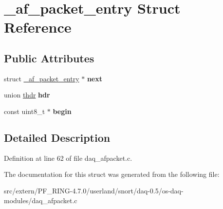 \hypertarget{struct__af__packet__entry}{
\section{\_\-af\_\-packet\_\-entry Struct Reference}
\label{struct__af__packet__entry}
}
\subsection*{Public Attributes}
\begin{DoxyCompactItemize}
\item 
\hypertarget{struct__af__packet__entry_a75d19df922f769b2d067deb10901497d}{
struct \hyperlink{struct__af__packet__entry}{\_\-af\_\-packet\_\-entry} $\ast$ {\bfseries next}}
\label{struct__af__packet__entry_a75d19df922f769b2d067deb10901497d}

\item 
\hypertarget{struct__af__packet__entry_ab53254aad7e64e8436a22a64a8fa0d43}{
union \hyperlink{unionthdr}{thdr} {\bfseries hdr}}
\label{struct__af__packet__entry_ab53254aad7e64e8436a22a64a8fa0d43}

\item 
\hypertarget{struct__af__packet__entry_a6fa8230c8a3337d7293ad7435901138b}{
const uint8\_\-t $\ast$ {\bfseries begin}}
\label{struct__af__packet__entry_a6fa8230c8a3337d7293ad7435901138b}

\end{DoxyCompactItemize}


\subsection{Detailed Description}


Definition at line 62 of file daq\_\-afpacket.c.



The documentation for this struct was generated from the following file:\begin{DoxyCompactItemize}
\item 
src/extern/PF\_\-RING-\/4.7.0/userland/snort/daq-\/0.5/os-\/daq-\/modules/daq\_\-afpacket.c\end{DoxyCompactItemize}
